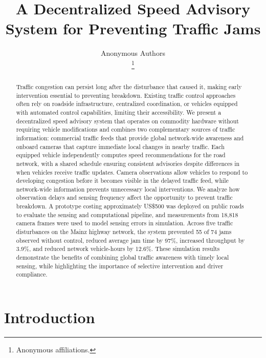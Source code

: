\documentclass[letterpaper, 10pt, journal, twoside]{IEEEtran}
\title{A Decentralized Speed Advisory System for Preventing Traffic Jams}
\author{Anonymous Authors%

\thanks{Anonymous affiliations.}%

}
\begin{document}
\maketitle

\begin{abstract}

Traffic congestion can persist long after the disturbance that caused it, making early intervention essential to preventing breakdown. Existing traffic control approaches often rely on roadside infrastructure, centralized coordination, or vehicles equipped with automated control capabilities, limiting their accessibility. We present a decentralized speed advisory system that operates on commodity hardware without requiring vehicle modifications and combines two complementary sources of traffic information: commercial traffic feeds that provide global network-wide awareness and onboard cameras that capture immediate local changes in nearby traffic. Each equipped vehicle independently computes speed recommendations for the road network, with a shared schedule ensuring consistent advisories despite differences in when vehicles receive traffic updates. Camera observations allow vehicles to respond to developing congestion before it becomes visible in the delayed traffic feed, while network-wide information prevents unnecessary local interventions. We analyze how observation delays and sensing frequency affect the opportunity to prevent traffic breakdown. A prototype costing approximately US\$500 was deployed on public roads to evaluate the sensing and computational pipeline, and measurements from 18,818 camera frames were used to model sensing errors in simulation. Across five traffic disturbances on the Mainz highway network, the system prevented 55 of 74 jams observed without control, reduced average jam time by 97\%, increased throughput by 3.9\%, and reduced network vehicle-hours by 12.6\%. These simulation results demonstrate the benefits of combining global traffic awareness with timely local sensing, while highlighting the importance of selective intervention and driver compliance.

\end{abstract}

\section{Introduction}

\label{sec:intro}
\end{document}

